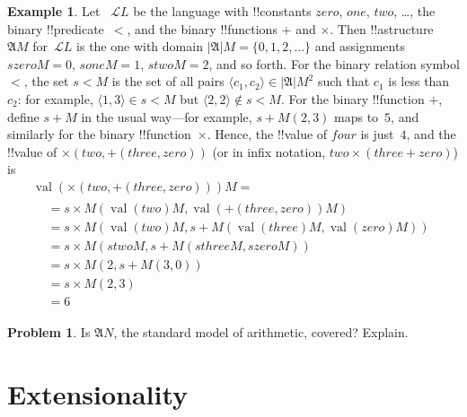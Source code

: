 \documentclass[10pt,a4paper]{article}
\theoremstyle{plain}
\theoremstyle{definition}
\newtheorem{ex}[thm]{Example}
\newtheorem{prob}{Problem}[section]
\theoremstyle{remark}
\newcommand*{\olfileid}[3]{}
\newcommand*{\olsection}[1]{\section*{#1}}
\providecommand{\Obj}{}
\providecommand{\Struct}{\ensuremath{\mathfrak{A}}}
\providecommand{\Domain}{\ensuremath{|\mathfrak{A}|}}
\providecommand{\Assign}{\ensuremath{s}}
\providecommand{\Lang}{\ensuremath{\mathcal{L}}}
\providecommand{\tuple}[1]{\langle #1 \rangle}
\providecommand{\Value}[1]{\operatorname{val}(#1)}
\begin{document}
\begin{ex}
Let ~$\Lang L$ be the language with !!{constant}s $\Obj{zero}$,
$\Obj{one}$, $\Obj{two}$, \dots, the binary !!{predicate}~$<$, and the
binary !!{function}s $+$ and $\times$. Then !!a{structure}~$\Struct
M$ for~$\Lang L$ is the one with domain $\Domain M = \{0, 1, 2, \ldots
\}$ and assignments $\Assign{\Obj{zero}}{M} = 0$,
$\Assign{\Obj{one}}{M} = 1$, $\Assign{\Obj{two}}{M} = 2$, and so
forth. For the binary relation symbol $<$, the set $\Assign{<}{M}$ is
the set of all pairs $\tuple{c_1, c_2} \in \Domain{M}^2$ such that
$c_1$ is less than~$c_2$: for example, $\tuple{1, 3} \in
\Assign{<}{M}$ but $\tuple{2, 2} \notin \Assign{<}{M}$. For the binary
!!{function} $+$, define $\Assign{+}{M}$ in the usual way---for
example, $\Assign{+}{M}(2,3)$ maps to~$5$, and similarly for the
binary !!{function}~$\times$. Hence, the !!{value} of $\Obj{four}$ is
just~$4$, and the !!{value} of $\times(\Obj{two},
+(\Obj{three},\Obj{zero}))$ (or in infix notation, $\Obj{two} \times
(\Obj{three} + \Obj{zero})$) is
\begin{multline*}
\Value{\times(\Obj{two}, +(\Obj{three},\Obj{zero}))}{M} =\\
\begin{aligned}
& =\Assign{\times}{M}(\Value{\Obj{two}}{M}, \Value{+(\Obj{three}, \Obj{zero})}{M})\\
& = \Assign{\times}{M}(\Value{\Obj{two}}{M}, \Assign{+}{M}(\Value{\Obj{three}}{M},
\Value{\Obj{zero}}{M})) \\
& = \Assign{\times}{M}(\Assign{\Obj{two}}{M}, \Assign{+}{M}(\Assign{\Obj{three}}{M},
\Assign{\Obj{zero}}{M})) \\
& = \Assign{\times}{M}(2, \Assign{+}{M}(3, 0)) \\
& = \Assign{\times}{M}(2, 3) \\
& = 6
\end{aligned}
\end{multline*}
\end{ex}

\begin{prob}
Is $\Struct N$, the standard model of arithmetic, covered? Explain.
\end{prob}





\olfileid{fol}{syn}{ext}

\olsection{Extensionality}
\end{document}
